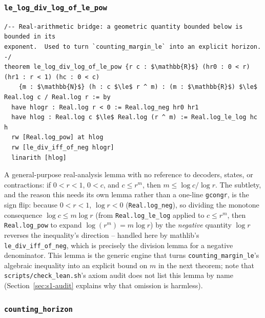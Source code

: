\documentclass[11pt]{article}
\begin{document}
\subsubsection*{\texttt{le\_log\_div\_log\_of\_le\_pow}}

\begin{lstlisting}
/-- Real-arithmetic bridge: a geometric quantity bounded below is bounded in its
exponent.  Used to turn `counting_margin_le` into an explicit horizon. -/
theorem le_log_div_log_of_le_pow {r c : $\mathbb{R}$} (hr0 : 0 < r) (hr1 : r < 1) (hc : 0 < c)
    {m : $\mathbb{N}$} (h : c $\le$ r ^ m) : (m : $\mathbb{R}$) $\le$ Real.log c / Real.log r := by
  have hlogr : Real.log r < 0 := Real.log_neg hr0 hr1
  have hlog : Real.log c $\le$ Real.log (r ^ m) := Real.log_le_log hc h
  rw [Real.log_pow] at hlog
  rw [le_div_iff_of_neg hlogr]
  linarith [hlog]
\end{lstlisting}

A general-purpose real-analysis lemma with no reference to decoders, states,
or contractions: if $0<r<1$, $0<c$, and $c \le r^m$, then
$m \le \log c/\log r$. The subtlety, and the reason this needs its own lemma
rather than a one-line \texttt{gcongr}, is the sign flip: because $0<r<1$,
$\log r < 0$ (\texttt{Real.log\_neg}), so dividing the monotone consequence
$\log c \le m\log r$ (from \texttt{Real.log\_le\_log} applied to $c\le r^m$,
then \texttt{Real.log\_pow} to expand $\log(r^m)=m\log r$) by the
\emph{negative} quantity $\log r$ reverses the inequality's direction --
handled here by mathlib's \texttt{le\_div\_iff\_of\_neg}, which is precisely
the division lemma for a negative denominator. This lemma is the generic
engine that turns \texttt{counting\_margin\_le}'s algebraic inequality into an
explicit bound on $m$ in the next theorem; note that \texttt{scripts/check\_lean.sh}'s
axiom audit does not list this lemma by name (Section~\ref{sec:s1-audit}
explains why that omission is harmless).

\subsubsection*{\texttt{counting\_horizon}}
\end{document}
